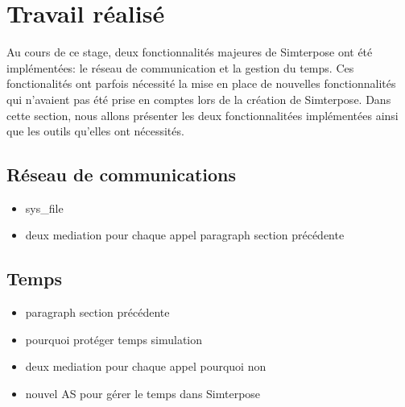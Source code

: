\section{Travail réalisé}
Au cours de ce stage, deux fonctionnalités majeures de Simterpose ont été implémentées: le réseau de communication et la gestion du temps. Ces fonctionalités ont parfois nécessité la mise en place de nouvelles fonctionnalités qui n'avaient pas été prise en comptes lors de la création de Simterpose. Dans cette section, nous allons présenter les deux fonctionnalitées implémentées ainsi que les outils qu'elles ont nécessités.

\subsection{Réseau de communications}

\begin{itemize}
\item sys\_file
\item deux mediation pour chaque appel paragraph section précédente
\end{itemize}

\subsection{Temps}
\begin{itemize}
\item paragraph section précédente
\item pourquoi protéger temps simulation
\item deux mediation pour chaque appel pourquoi non
\item nouvel AS pour gérer le temps dans Simterpose
\end{itemize}
